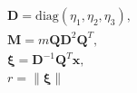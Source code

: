 $$
\begin{gathered}
\mathbf D = \mathrm{diag}\left(\eta_1, \eta_2, \eta_3\right),\\
\mathbf M = m \mathbf Q \mathbf D^{2} \mathbf Q^{T},\\
\boldsymbol\xi = \mathbf D^{-1} \mathbf Q^{T} \mathbf x,\\
r = \lVert\boldsymbol\xi\rVert
\end{gathered}
$$

